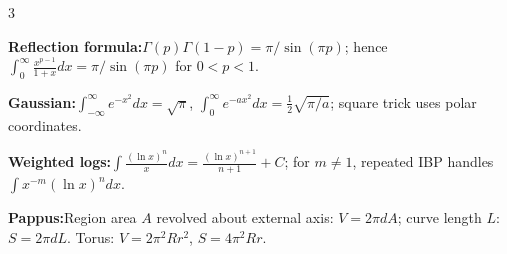 \documentclass[10pt]{article}
\newenvironment{cheatitems}{\par\vspace{-2pt}}{\par\vspace{-2pt}}
\newcommand{\cheatrow}[2]{%
  \par\noindent\textbf{#1:}\nobreak\hspace{0.25em}#2\par
}
\begin{document}
\begin{multicols}{3}
\begin{cheatitems}
\cheatrow{Reflection formula}{$\Gamma(p)\Gamma(1-p)\!=\!\pi/\sin(\pi p)$; hence $\int_0^\infty\frac{x^{p-1}}{1+x}dx\!=\!\pi/\sin(\pi p)$ for $0<p<1$.}
\cheatrow{Gaussian}{$\int_{-\infty}^\infty e^{-x^2}dx\!=\!\sqrt\pi$, $\int_0^\infty e^{-ax^2}dx\!=\!\frac12\sqrt{\pi/a}$; square trick uses polar coordinates.}
\cheatrow{Weighted logs}{$\int\frac{(\ln x)^n}{x}dx\!=\!\frac{(\ln x)^{n+1}}{n+1}+C$; for $m\ne1$, repeated IBP handles $\int x^{-m}(\ln x)^n dx$.}
\cheatrow{Pappus}{Region area $A$ revolved about external axis: $V\!=\!2\pi dA$; curve length $L$: $S\!=\!2\pi dL$. Torus: $V\!=\!2\pi^2Rr^2$, $S\!=\!4\pi^2Rr$.}


\end{cheatitems}
\end{multicols}
\end{document}
